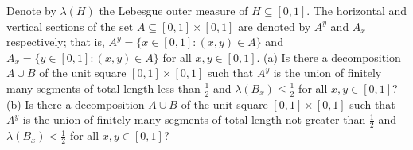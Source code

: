 Denote by $\lambda (H)$ the Lebesgue outer measure of $H\subseteq \left[ 0,1\right]$. The horizontal and vertical sections of the set $A\subseteq [0, 1]\times [ 0, 1]$ are denoted by $A^y$ and $A_x$ respectively; that is, $A^y=\{ x\in [ 0, 1] \colon (x, y) \in A\}$ and $A_x=\{ y\in [ 0, 1]\colon (x,y)\in A\}$ for all $x,y\in [0,1]$.
(a) Is there a decomposition $A\cup B$ of the unit square $[0,1]\times [0,1]$ such that $A^y$ is the union of finitely many segments of total length less than $\frac12$ and $\lambda (B_x)\le \frac12$ for all $x, y\in [0,1]$?
(b) Is there a decomposition $A\cup B$ of the unit square $[0,1] \times [0,1]$ such that $A^y$ is the union of finitely many segments of total length not greater than $\frac12$ and $\lambda (B_x)<\frac12$ for all $x,y\in [0,1]$?